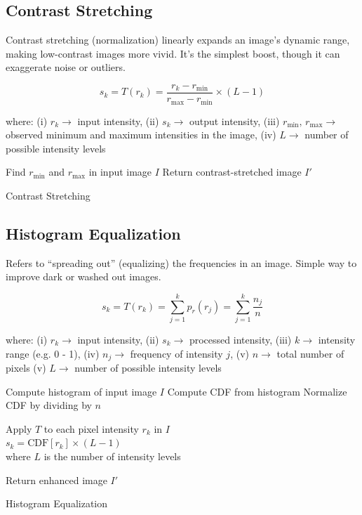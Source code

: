 \subsection*{Contrast Stretching}

Contrast stretching (normalization) linearly expands an image’s
dynamic range, making low-contrast images more vivid. It’s the
simplest boost, though it can exaggerate noise or outliers.

\begin{equation*}
  s_k = T(r_k)
  = \frac{r_k - r_{\min}}{r_{\max} - r_{\min}}
  \times (L - 1)
\end{equation*}

where: (i) $r_k\rightarrow$ input intensity, (ii) $s_k\rightarrow$
output intensity, (iii) $r_{\min},\,r_{\max}\rightarrow$ observed
minimum and maximum intensities in the image, (iv) $L\rightarrow$
number of possible intensity levels

\begin{algorithm}[ht!]
  \DontPrintSemicolon
  Find $r_{\min}$ and $r_{\max}$ in input image $I$ \;
  {
  }
  Return contrast-stretched image $I'$\;
  \caption{Contrast Stretching}
\end{algorithm}

\subsection*{Histogram Equalization}

Refers to \enquote{spreading out} (equalizing) the frequencies in an
image. Simple way to improve dark or washed out images.

\begin{equation*}
  s_k = T(r_k) = \sum_{j=1}^{k} p_r(r_j) = \sum_{j=1}^{k} \frac{n_j}{n}
\end{equation*}

where: (i) $r_k \rightarrow$ input intensity, (ii) $s_k \rightarrow$
processed intensity, (iii) $k \rightarrow$ intensity range (e.g. 0 -
1), (iv) $n_j \rightarrow$ frequency of intensity $j$, (v) $n
\rightarrow$ total number of pixels (v) $L\rightarrow$ number of
possible intensity levels

\begin{algorithm}[ht!]
  \DontPrintSemicolon
  Compute histogram of input image $I$ \;
  Compute CDF from histogram \;
  Normalize CDF by dividing by $n$ \;

  {
    Apply $T$ to each pixel intensity $r_k$ in $I$\\
    \nonl $s_k = \text{CDF}[r_k] \times (L - 1)$ \\
    \nonl where $L$ is the number of intensity levels \;
  }

  Return enhanced image $I'$\;
  \caption{Histogram Equalization}
\end{algorithm}

